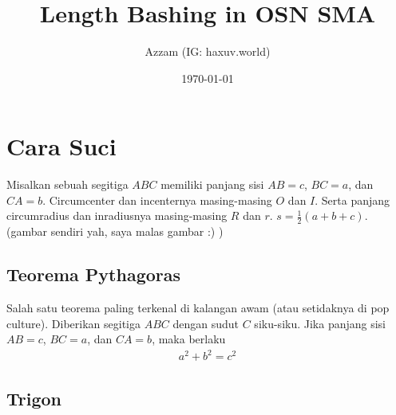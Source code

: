 \documentclass[11pt]{scrartcl}
\title{Length Bashing in OSN SMA}
\author{Azzam (IG: haxuv.world)}
\date{\today}
\begin{document}
\maketitle

\renewcommand*\contentsname{Daftar Isi}
\tableofcontents

\newpage

\section{Cara Suci}
Misalkan sebuah segitiga $ABC$ memiliki panjang sisi $AB=c$, $BC=a$, dan $CA=b$. Circumcenter dan incenternya masing-masing $O$ dan $I$. Serta panjang circumradius dan inradiusnya masing-masing $R$ dan $r$. $s=\frac{1}{2}(a+b+c)$. (gambar sendiri yah, saya malas gambar :) )

\subsection{Teorema Pythagoras}
Salah satu teorema paling terkenal di kalangan awam (atau setidaknya di pop culture). Diberikan segitiga $ABC$ dengan sudut $C$ siku-siku. Jika panjang sisi $AB=c$, $BC=a$, dan $CA=b$, maka berlaku
\begin{align*}
    a^2+b^2=c^2
\end{align*}
\begin{center}
\end{center}

\subsection{Trigon}
\end{document}
